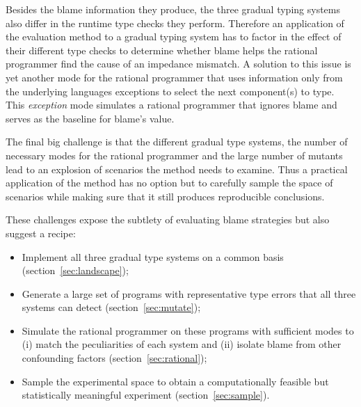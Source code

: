 Besides the blame information they produce, the three gradual typing
systems also differ in the runtime type checks they perform. Therefore an
application of the evaluation method to a gradual typing system has to
factor in the effect of their different type checks to determine whether blame helps the
rational programmer find the cause of an impedance mismatch. A solution to this issue
is yet another mode for the rational programmer that uses information only
from the underlying languages exceptions to select the next component(s) to type.
This \emph{exception} mode simulates a rational programmer that ignores
blame and serves as the baseline for blame's value.


The final big challenge is that the different gradual type
systems, the number of necessary modes for the rational programmer
and the large number of mutants lead to an explosion of scenarios the
method needs to examine. Thus a practical application of the
method has no option but to carefully sample the space of scenarios while 
making sure that it still produces reproducible conclusions.


\smallskip

These challenges expose the subtlety of evaluating blame strategies but
also suggest a recipe:


\begin{itemize}

\item Implement all three gradual type systems on a common
  basis (section~\ref{sec:landscape});

\item Generate a large set of programs with representative
  type errors that all three systems can detect (section~\ref{sec:mutate}); 
    
\item Simulate the rational programmer on these programs with sufficient 
  modes to (i) match the peculiarities of each  system and 
    (ii) isolate blame from other confounding factors
    (section~\ref{sec:rational});



\item Sample the experimental space  to obtain a computationally feasible
  but statistically meaningful experiment (section~\ref{sec:sample}).

\end{itemize}
